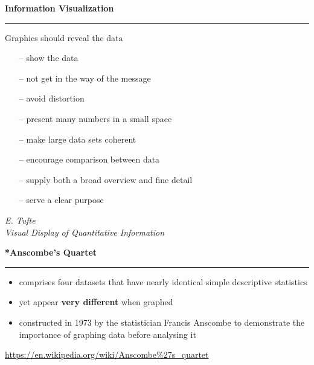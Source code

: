 \documentclass[pdf]{beamer}
\begin{document}

\begin{frame}
    {{\textbf{Information Visualization}}}{\textcolor{red}{\rule{12cm}{1.2pt}}}
    
    \Large Graphics should reveal the data
    \begin{itemize}
    \setlength{\baselineskip}{4mm}
	\item[\textcolor{black}{--}] {\normalsize show the data}
    \item[\textcolor{black}{--}] {\normalsize not get in the way of the message}
    \item[\textcolor{black}{--}] {\normalsize avoid distortion}
    \item[\textcolor{black}{--}] {\normalsize present many numbers in a small space}
    \item[\textcolor{black}{--}] {\normalsize make large data sets coherent}
    \item[\textcolor{black}{--}] {\normalsize encourage comparison between data}
    \item[\textcolor{black}{--}] {\normalsize supply both a broad overview and fine detail}
	\item[\textcolor{black}{--}] {\normalsize serve a clear purpose}
    \end{itemize}
    \begin{flushright}
    \setlength{\baselineskip}{0em}
    {\normalsize \itshape E. Tufte\\
    Visual Display of Quantitative Information}
    \end{flushright}
    \vfill
\end{frame}




\begin{frame}
    {{\textbf{*Anscombe’s Quartet}}}{\textcolor{red}{\rule{12cm}{1.2pt}}}

\begin{itemize}
\item comprises four datasets that have nearly identical simple descriptive statistics

\item yet appear \textbf{very different} when graphed

\item constructed in 1973 by the statistician Francis Anscombe to demonstrate the importance of graphing data before analysing it 
\end{itemize}
    
\url{https://en.wikipedia.org/wiki/Anscombe\%27s_quartet}

\end{frame}
\end{document}
